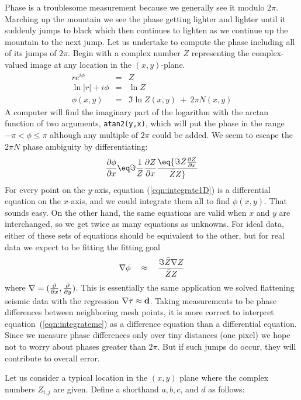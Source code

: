 \par
Phase is a troublesome measurement because
we generally see it modulo $2\pi$.
Marching up the mountain we see the phase getting lighter and lighter
until it suddenly jumps to black which then continues to lighten
as we continue up the mountain to the next jump.
Let us undertake to compute the phase including
all of its jumps of $2\pi$.
Begin with a complex number $Z$ representing
the complex-valued image at any location
in the $(x,y)$-plane.
\begin{eqnarray}
r e^{i \phi}   &=& Z \\
\ln |r| + i \phi &=& \ln Z \\
\phi(x,y)            &=&  \Im \ln Z(x,y) ~+~  2\pi N(x,y)
\end{eqnarray}
A computer will find the imaginary part of the logarithm
with the arctan function of two arguments, {\tt atan2(y,x)},
which will put the phase in the range $-\pi < \phi \le \pi$
although any multiple of $2\pi$ could be added.
We seem to escape the $2\pi N$ phase ambiguity by differentiating:
\begin{eqnarray}
{\partial\phi \over \partial x} \eq \Im {1 \over Z}{\partial Z \over \partial x} \eq
                                   {\Im  \bar Z {\partial Z \over \partial x} \over \bar Z Z }
\label{eqn:integrate1D}
\end{eqnarray}
For every point on the $y$-axis, equation (\ref{eqn:integrate1D})
is a differential equation on the $x$-axis,
and we could integrate them all to find $\phi(x,y)$.
That sounds easy.
On the other hand,
the same equations are valid when $x$ and $y$ are interchanged,
so we get twice as many equations as unknowns.
For ideal data, either of these sets of equations
should be equivalent to the other,
but for real data we expect to be fitting the fitting goal
\begin{equation}
\nabla \phi \quad \approx \quad {\Im  \bar Z \nabla Z \over \bar Z Z}
\label{eqn:integrateme}
\end{equation}
where
$\nabla = ({\partial \over \partial x}, {\partial \over \partial y} ) $.
This is essentially the same application we solved flattening seismic data with the regression 
$\nabla \tau \approx {\bf d}$. Taking measurements to be phase differences 
between neighboring mesh points, it is more correct to interpret equation~(\ref{eqn:integrateme}) as 
a difference equation than a differential equation. Since we measure phase differences only over tiny distances (one pixel) we hope not to worry about phases greater than $2\pi$.
But if such jumps do occur, they will contribute to overall error.
\par
Let us consider a typical location in the $(x , y )$ plane where the complex numbers
$Z_{i,j}$ are given. Define a shorthand $a , b, c$, and $d$ as follows: 

